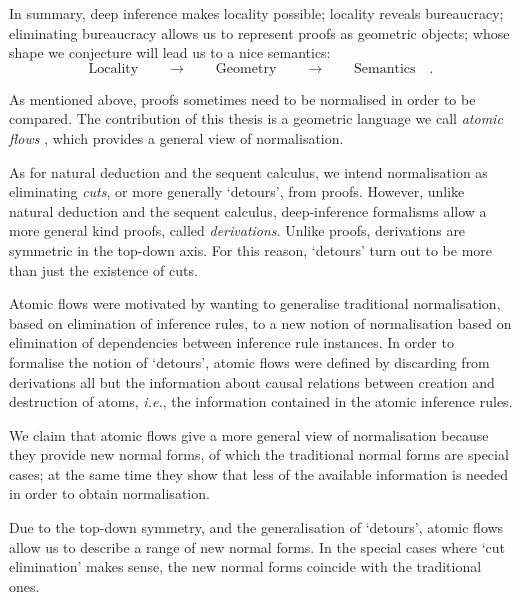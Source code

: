 In summary, deep inference makes locality possible; locality reveals bureaucracy; eliminating bureaucracy allows us to represent proofs as geometric objects; whose shape we conjecture will lead us to a nice semantics:
\[
\mbox{Locality}\qquad\rightarrow\qquad\mbox{Geometry}\qquad\rightarrow\qquad\mbox{Semantics}\quad.
\]

As mentioned above, proofs sometimes need to be normalised in order to be compared. The contribution of this thesis is a geometric language we call \emph{atomic flows} \cite{GuglGund:07:Normalis:lr}, which provides a general view of normalisation.


As for natural deduction and the sequent calculus, we intend normalisation as eliminating \emph{cuts}, or more generally `detours', from proofs. However, unlike natural deduction and the sequent calculus, deep-inference formalisms allow a more general kind proofs, called \emph{derivations}. Unlike proofs, derivations are symmetric in the top-down axis. For this reason, `detours' turn out to be more than just the existence of cuts.


Atomic flows were motivated by wanting to generalise traditional normalisation, based on elimination of inference rules, to a new notion of normalisation based on elimination of dependencies between inference rule instances. In order to formalise the notion of `detours', atomic flows were defined by discarding from derivations all but the information about causal relations between creation and destruction of atoms, \emph{i.e.}, the information contained in the atomic inference rules.


We claim that atomic flows give a more general view of normalisation because they provide new normal forms, of which the traditional normal forms are special cases; at the same time they show that less of the available information is needed in order to obtain normalisation. 


Due to the top-down symmetry, and the generalisation of `detours', atomic flows allow us to describe a range of new normal forms. In the special cases where `cut elimination' makes sense, the new normal forms coincide with the traditional ones.

